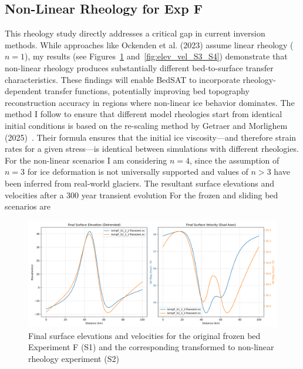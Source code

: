\subsection{Non-Linear Rheology for Exp F}
This rheology study directly addresses a critical gap in current inversion methods. While approaches like Ockenden et al. (2023) assume linear rheology ($n=1$), my results (see Figures~\ref{fig:elev_vel_S1_S2} and~\ref{fig:elev_vel_S3_S4}) demonstrate that non-linear rheology produces substantially different bed-to-surface transfer characteristics. These findings will enable BedSAT to incorporate rheology-dependent transfer functions, potentially improving bed topography reconstruction accuracy in regions where non-linear ice behavior dominates.
The method I follow to ensure that different model rheologies start from identical initial conditions is based on the re-scaling method by Getraer and Morlighem (2025)~\cite{Getraer_2025}. Their formula ensures that the initial ice viscosity—and therefore strain rates for a given stress—is identical between simulations with different rheologies.
For the non-linear scenarios I am considering $n = 4$, since the assumption of $n = 3$ for ice deformation is not universally supported and values of $n > 3$ have been inferred from real‐world glaciers. 
The resultant surface elevations and velocities after a 300 year transient evolution For the frozen and sliding bed scenarios are 
\begin{figure}[H]
    \includegraphics[scale=0.40]{figures/combined_elevation_detrended_surface_velocity_['S1']_['S2'].png}
    \caption{Final surface elevations and velocities for the original frozen bed Experiment F (S1) and the corresponding transformed to non-linear rheology experiment (S2)}
    \label{fig:elev_vel_S1_S2}
\end{figure}
